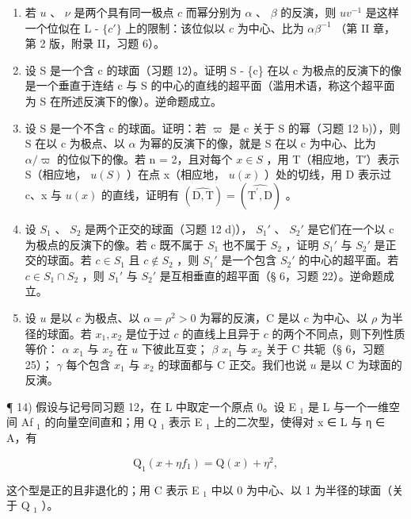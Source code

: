 \begin{enumerate}
\def\labelenumi{\alph{enumi})}
\item
  若 \(u\) 、 \(\nu\) 是两个具有同一极点 \(c\) 而幂分别为 \(\alpha\) 、 \(\beta\) 的反演，则 \(uv^{-1}\) 是这样一个位似在 L - \(\{c'\}\) 上的限制：该位似以 \(c\) 为中心、比为 \(\alpha\beta^{-1}\) （第 II 章，第 2 版，附录 II，习题 6）。
\item
  设 S 是一个含 c 的球面（习题 12）。证明 S - \{c\} 在以 c 为极点的反演下的像是一个垂直于连结 c 与 S 的中心的直线的超平面（滥用术语，称这个超平面为 S 在所述反演下的像）。逆命题成立。
\item
  设 S 是一个不含 c 的球面。证明：若 \(\varpi\) 是 c 关于 S 的幂（习题 12 b)），则 S 在以 c 为极点、以 \(\alpha\) 为幂的反演下的像，就是 S 在以 c 为中心、比为 \(\alpha/\varpi\) 的位似下的像。若 n = 2，且对每个 \(x \in S\) ，用 T（相应地，T′）表示 S（相应地， \(u(S)\) ）在点 x（相应地， \(u(x)\) ）处的切线，用 D 表示过 c、x 与 \(u(x)\) 的直线，证明有 \((\widehat{\mathrm{D},\mathrm{T}}) = (\widehat{\mathrm{T}^{\prime},\mathrm{D}})\) 。
\item
  设 \(S_{1}\) 、 \(S_{2}\) 是两个正交的球面（习题 12 d)）， \(S_{1}'\) 、 \(S_{2}'\) 是它们在一个以 c 为极点的反演下的像。若 c 既不属于 \(S_{1}\) 也不属于 \(S_{2}\) ，证明 \(S_{1}'\) 与 \(S_{2}'\) 是正交的球面。若 \(c \in S_{1}\) 且 \(c \notin S_{2}\) ，则 \(S_{1}'\) 是一个包含 \(S_{2}'\) 的中心的超平面。若 \(c \in S_{1} \cap S_{2}\) ，则 \(S_{1}'\) 与 \(S_{2}'\) 是互相垂直的超平面（§ 6，习题 22）。逆命题成立。
\item
  设 \(u\) 是以 \(c\) 为极点、以 \(\alpha = \rho^2 > 0\) 为幂的反演，C 是以 \(c\) 为中心、以 \(\rho\) 为半径的球面。若 \(x_1, x_2\) 是位于过 \(c\) 的直线上且异于 \(c\) 的两个不同点，则下列性质等价： \(\alpha\) \(x_1\) 与 \(x_2\) 在 \(u\) 下彼此互变； \(\beta\) \(x_1\) 与 \(x_2\) 关于 C 共轭（§ 6，习题 25）； \(\gamma\) 每个包含 \(x_1\) 与 \(x_2\) 的球面都与 C 正交。我们也说 \(u\) 是以 C 为球面的反演。
\end{enumerate}

¶ 14) 假设与记号同习题 12，在 L 中取定一个原点 0。设 E \(_{1}\) 是 L 与一个一维空间 Af \(_{1}\) 的向量空间直和；用 Q \(_{1}\) 表示 E \(_{1}\) 上的二次型，使得对 x ∈ L 与 η ∈ A，有

\[
\mathrm{Q} _ {1} (x + \eta f _ {1}) = \mathrm{Q} (x) + \eta^ {2},
\]

这个型是正的且非退化的；用 C 表示 E \(_{1}\) 中以 0 为中心、以 1 为半径的球面（关于 Q \(_{1}\) ）。


